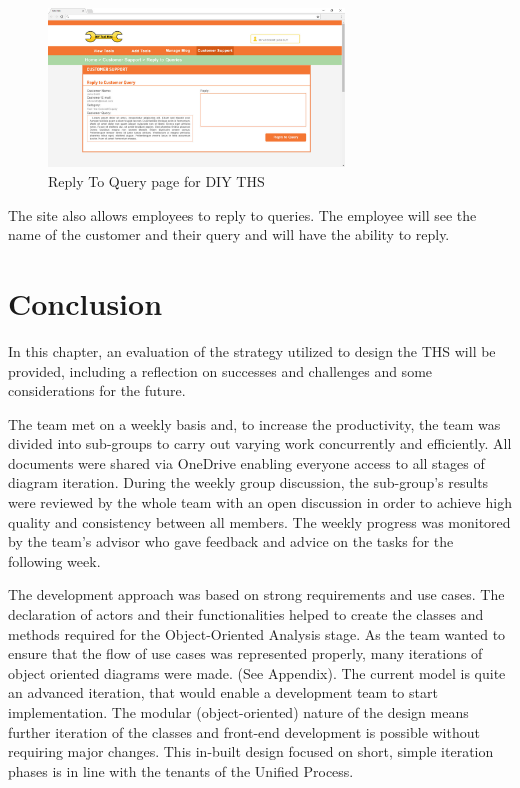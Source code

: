 \begin{figure}[H]
      \centering
      \includegraphics[trim = 0 0 0 0, clip, width=0.7\textwidth]{TempImg/qreply.png}
      \caption{Reply To Query page for DIY THS}
 \end{figure}

The site also allows employees to reply to queries. The employee will
see the name of the customer and their query and will have the ability
to reply.

\newpage

\hypertarget{conclusion}{%
\section{Conclusion}\label{conclusion}}

In this chapter, an evaluation of the strategy utilized to design the
THS will be provided, including a reflection on successes and challenges
and some considerations for the future.

The team met on a weekly basis and, to increase the productivity, the
team was divided into sub-groups to carry out varying work concurrently
and efficiently. All documents were shared via OneDrive enabling
everyone access to all stages of diagram iteration. During the weekly
group discussion, the sub-group's results were reviewed by the whole
team with an open discussion in order to achieve high quality and
consistency between all members. The weekly progress was monitored by
the team's advisor who gave feedback and advice on the tasks for the
following week.

The development approach was based on strong requirements and use cases.
The declaration of actors and their functionalities helped to create the
classes and methods required for the Object-Oriented Analysis stage. As
the team wanted to ensure that the flow of use cases was represented
properly, many iterations of object oriented diagrams were made. (See
Appendix). The current model is quite an advanced iteration, that would
enable a development team to start implementation. The modular
(object-oriented) nature of the design means further iteration of the
classes and front-end development is possible without requiring major
changes. This in-built design focused on short, simple iteration phases
is in line with the tenants of the Unified Process.

